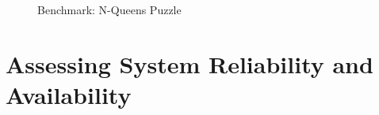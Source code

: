 \begin{figure}[h]
     \begin{center}
    \end{center}
    \caption{Benchmark: N-Queens Puzzle}
   \label{nqueens_efficiency}
\end{figure}



\newpage
\section{Assessing System Reliability and Availability}
\label{reliability}

